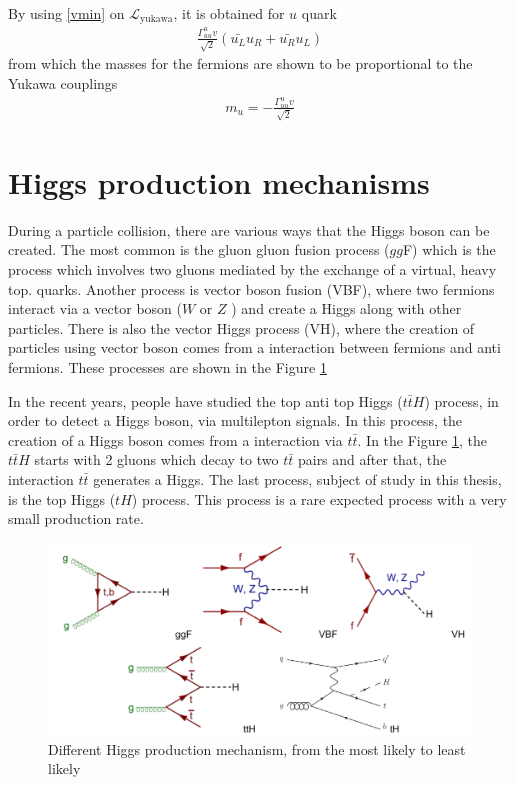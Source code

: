 By using \ref{vmin} on $\mathcal{L}_\text{yukawa}$, it is obtained for $u$ quark
\begin{align*}
\frac{\Gamma^u_{uu}v}{\sqrt{2}}(\bar{u_L}u_R+\bar{u_R}u_L)
\end{align*}
from which the masses for the fermions are shown to be proportional to the Yukawa couplings
\begin{align*}
m_u=-\frac{\Gamma^u_{uu}v}{\sqrt{2}}
\end{align*}
 
\pagebreak

\section{Higgs production mechanisms}
During a particle collision, there are various ways that the Higgs boson can be created. The most common is the gluon gluon fusion process ($gg$F) which is the process which involves two gluons mediated by the exchange of a virtual, heavy top.
quarks. Another process is vector boson fusion (VBF), where two fermions interact via a vector boson ($W$ or $Z$ ) and create a Higgs along with other particles. There is also the vector Higgs process (VH), where the creation of particles using vector boson comes from a interaction between fermions and anti fermions\cite{pd}. These processes are shown in the Figure \ref{psu}

In the recent years, people have studied the top anti top Higgs ($t\bar{t}H$) process, in order to detect a Higgs boson, via multilepton signals\cite{th1}.
In this process, the creation of a Higgs boson comes from a interaction via $t\bar{t}$. In the Figure \ref{psu}, the $t\bar{t}H$ starts with 2 gluons which decay to two $t\bar{t}$ pairs and after that, the interaction $t\bar{t}$ generates a Higgs. The last process, subject of study in this thesis, is the top Higgs ($tH$) process. This process is a rare expected process with a very small production rate\cite{pd}. 

\begin{figure}[ht]
\centering
\includegraphics[scale=0.5]{Chapter1/pg.png}
\caption[Higgs production mechanism]{Different Higgs production mechanism, from the most likely to least likely \cite{gamma}\cite{timo}}
\label{psu}
\end{figure}

